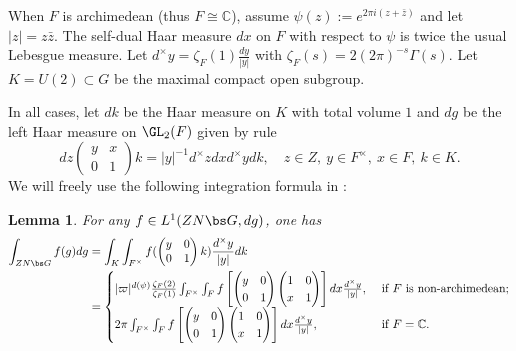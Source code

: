 \documentclass[11pt,reqno]{amsart}
\newcommand{\BC}{{\mathbb {C}}} \newcommand{\BD}{{\mathbb {D}}}
\theoremstyle{plain}
\newtheorem{lem}[thm]{Lemma}  \newtheorem{prop}[thm]{Proposition}
\theoremstyle{remark} \newtheorem{remark}[thm]{Remark}
\theoremstyle{definition} \newtheorem{exercise}[thm]{Exercise}
\theoremstyle{definition} \newtheorem{example}[thm]{Example} \newtheorem{condition}[thm]{Condition}
\numberwithin{equation}{section}
\renewcommand{\-}{\text{--}}
\begin{document}
When $F$ is archimedean (thus $F\cong\BC$), assume $\psi(z):=e^{2\pi i(z+\bar{z})}$ and let $|z|=z\bar{z}$. The self-dual Haar measure $dx$ on $F$ with respect to $\psi$ is twice the usual Lebesgue measure. Let $d^\times y=\zeta_F(1)\frac{d y}{|y|}$ with  $\zeta_F(s)=2(2\pi)^{-s}\Gamma(s)$. Let $K=U(2)\subset G$ be the maximal compact open subgroup. 


In all cases, let $dk$ be the Haar measure on $K$ with total volume $1$ and $dg$ be the left Haar measure on $\GL_2(F)$ given by rule \[dz\begin{pmatrix} y & x \\ 0 & 1\end{pmatrix}k=|y|^{-1}d^\times z dx d^\times y dk,\quad z\in Z,\ y\in F^\times,\ x\in F,\ k\in K.\] 
We will freely use the following integration formula in \cite[Section 3.1.6]{MV10}:
\begin{lem}\label{int}For any $f\in L^1(ZN\bs G,dg)$, one has 
\begin{align*}\int_{ZN\bs G}f(g)dg &=\int_K\int_{F^\times} f(\begin{pmatrix}y & 0\\0 & 1\end{pmatrix}k)\frac{d^\times y}{|y|} dk\\
&=\begin{cases}|\varpi|^{d(\psi)}\frac{\zeta_F(2)}{\zeta_F(1)}\int_{F^\times}\int_Ff\left[\begin{pmatrix} y & 0\\ 0 & 1\end{pmatrix} \begin{pmatrix} 1 & 0 \\ x & 1\end{pmatrix}\right]dx\frac{d^\times y}{|y|}, & \ \text{if $F$ is non-archimedean};\\
2\pi\int_{F^\times}\int_Ff\left[\begin{pmatrix} y & 0\\ 0 & 1\end{pmatrix} \begin{pmatrix} 1 & 0 \\ x & 1\end{pmatrix}\right]dx\frac{d^\times y}{|y|}, &\ \text{if $F=\BC$}.\end{cases}
\end{align*}
\end{lem}
\end{document}
